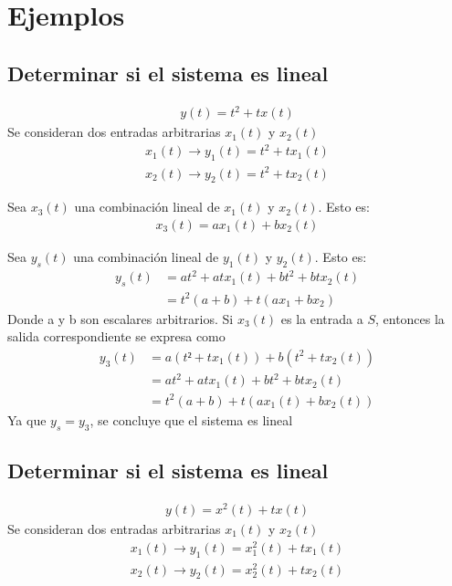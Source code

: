 \documentclass{article}
\begin{document}
\section{Ejemplos}
\subsection{Determinar si el sistema es lineal}
\begin{align}
	y(t) = t^2 + tx(t)
\end{align}
Se consideran dos entradas arbitrarias $x_1(t)$ y $x_2(t)$\\
\begin{align}
	x_1(t) \rightarrow y_1(t) = t^2 + tx_1(t)\\
	x_2(t) \rightarrow y_2(t) = t^2 + tx_2(t)
\end{align}

Sea $x_3(t)$ una combinación lineal de $x_1(t)$ y $x_2(t).$ Esto es:\\
\begin{align}
	x_3(t) = ax_1(t) + bx_2(t)
\end{align}

Sea $y_s(t)$ una combinación lineal de $y_1(t)$ y $y_2(t).$ Esto es:\\
\begin{align}
	y_s(t) &= at^2 + atx_1(t) + bt^2 + btx_2(t)\\
		   &= t^2(a+b) + t(ax_1 + bx_2)
\end{align}
Donde a y b son escalares arbitrarios. Si $x_3(t) $ es la entrada a $S$, entonces la salida correspondiente se expresa como\\
\begin{align}
	y_3(t) &= a(t² + tx_1(t)) + b(t^2 + tx_2(t))\\
		   &= at^2 + atx_1(t) + bt^2 + btx_2(t)\\
		   &= t^2(a+b) + t(ax_1(t) + bx_2(t))
\end{align}
Ya que $y_s = y_3$, se concluye que el sistema es lineal
\setcounter{equation}{0}
\subsection{Determinar si el sistema es lineal}
\begin{align}
y(t) = x^2(t) + tx(t)
\end{align}
Se consideran dos entradas arbitrarias $x_1(t)$ y $x_2(t)$\\
\begin{align}
x_1(t) \rightarrow y_1(t) = x_1^2(t) + tx_1(t)\\
x_2(t) \rightarrow y_2(t) = x_2^2(t) + tx_2(t)
\end{align}
\end{document}

